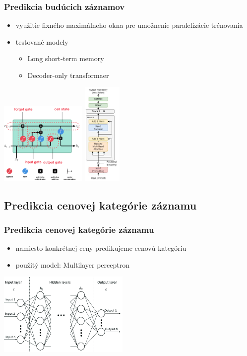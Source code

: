 \documentclass[slovak]{beamer}
\begin{document}
\begin{frame}
	\frametitle{Predikcia budúcich záznamov}
	\begin{itemize}
		\item<1> využitie fixného maximálneho okna pre umožnenie paralelizácie trénovania
		\item<1> testované modely
		 \begin{itemize}
		 	\item<1> Long short-term memory
		 	\item<1> Decoder-only transformaer
		 \end{itemize}
	\end{itemize}
	\begin{center}
		\includegraphics[height=4cm]{images/LSTM_arch.png}
		\includegraphics[height=5cm]{images/decod_only_trans_arch.png}
	\end{center}
\end{frame}

\subsection{Predikcia cenovej kategórie záznamu}

\begin{frame}
	\frametitle{Predikcia cenovej kategórie záznamu}
	\begin{itemize}
		\item<1> namiesto konkrétnej ceny predikujeme cenovú kategóriu
		\item<1> použitý model: Multilayer perceptron
	\end{itemize}
	\begin{center}
		\includegraphics[height=4cm]{images/MLP_arch.png}
	\end{center}
\end{frame}
\end{document}
